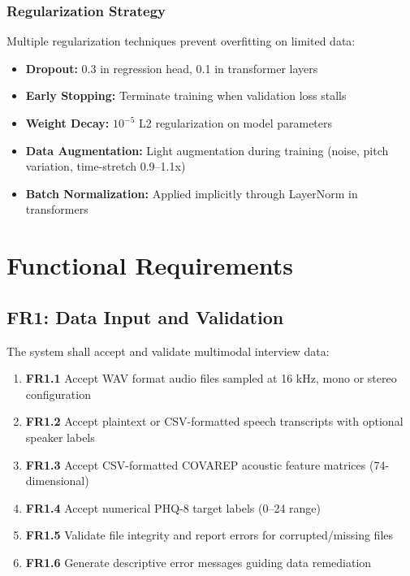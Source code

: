 \documentclass[12pt]{article}
\begin{document}
	\subsubsection{Regularization Strategy}

	Multiple regularization techniques prevent overfitting on limited data:

	\begin{itemize}
		\item \textbf{Dropout:} 0.3 in regression head, 0.1 in transformer layers
		\item \textbf{Early Stopping:} Terminate training when validation loss stalls
		\item \textbf{Weight Decay:} $10^{-5}$ L2 regularization on model parameters
		\item \textbf{Data Augmentation:} Light augmentation during training (noise, pitch variation, time-stretch 0.9--1.1x)
		\item \textbf{Batch Normalization:} Applied implicitly through LayerNorm in transformers
	\end{itemize}


	\section{Functional Requirements}

	\subsection{FR1: Data Input and Validation}

	The system shall accept and validate multimodal interview data:

	\begin{enumerate}
		\item \textbf{FR1.1} Accept WAV format audio files sampled at 16 kHz, mono or stereo configuration
		\item \textbf{FR1.2} Accept plaintext or CSV-formatted speech transcripts with optional speaker labels
		\item \textbf{FR1.3} Accept CSV-formatted COVAREP acoustic feature matrices (74-dimensional)
		\item \textbf{FR1.4} Accept numerical PHQ-8 target labels (0--24 range)
		\item \textbf{FR1.5} Validate file integrity and report errors for corrupted/missing files
		\item \textbf{FR1.6} Generate descriptive error messages guiding data remediation
	\end{enumerate}
\end{document}
